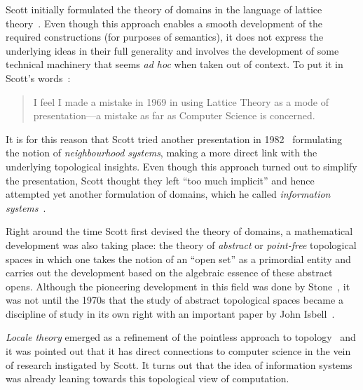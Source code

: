 \documentclass{article}
\begin{document}
Scott initially formulated the theory of domains in the language of lattice
theory~\cite{birkhoff:1940}. Even though this approach enables a smooth development of the
required constructions (for purposes of semantics), it does not express the underlying
ideas in their full generality and involves the development of some technical machinery
that seems \emph{ad hoc} when taken out of context. To put it in Scott's
words~\cite[pg.~577]{scott:1982}:

\begin{quote}
  I feel I made a mistake in 1969 in using Lattice Theory as a mode of
  presentation---a mistake as far as Computer Science is concerned.
\end{quote}

It is for this reason that Scott tried another presentation in 1982~\cite{scott:1981}
formulating the notion of \emph{neighbourhood systems}, making a more direct link with the
underlying topological insights. Even though this approach turned out to simplify the
presentation, Scott thought they left ``too much implicit'' and hence attempted yet
another formulation of domains, which he called \emph{information systems}~\cite{scott:1982}.

Right around the time Scott first devised the theory of domains, a mathematical
development was also taking place: the theory of \emph{abstract} or \emph{point-free}
topological spaces in which one takes the notion of an ``open set'' as a primordial entity
and carries out the development based on the algebraic essence of these abstract opens.
Although the pioneering development in this field was done by Stone~\cite{stone:1934}, it
was not until the 1970s that the study of abstract topological spaces became a discipline
of study in its own right with an important paper by John Isbell~\cite{isbell:1973}.

\emph{Locale theory} emerged as a refinement of the pointless approach to topology~\cite{
johnstone:1982} and it was pointed out that it has direct connections to computer
science in the vein of research instigated by Scott. It turns out that the idea of
information systems was already leaning towards this topological view of computation.

\end{document}
